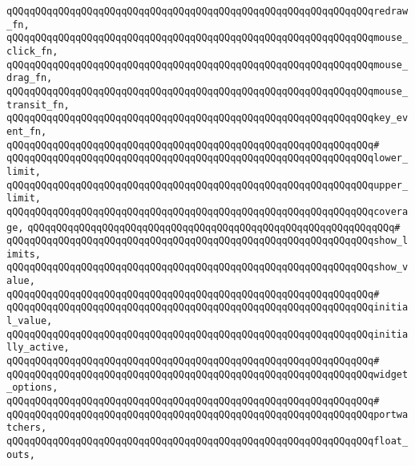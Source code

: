 \verb|qQQqqQQqqQQqqQQqqQQqqQQqqQQqqQQqqQQqqQQqqQQqqQQqqQQqqQQqqQQqqQQqredraw_fn,|\newline
\verb|qQQqqQQqqQQqqQQqqQQqqQQqqQQqqQQqqQQqqQQqqQQqqQQqqQQqqQQqqQQqqQQqmouse_click_fn,|\newline
\verb|qQQqqQQqqQQqqQQqqQQqqQQqqQQqqQQqqQQqqQQqqQQqqQQqqQQqqQQqqQQqqQQqmouse_drag_fn,|\newline
\verb|qQQqqQQqqQQqqQQqqQQqqQQqqQQqqQQqqQQqqQQqqQQqqQQqqQQqqQQqqQQqqQQqmouse_transit_fn,|\newline
\verb|qQQqqQQqqQQqqQQqqQQqqQQqqQQqqQQqqQQqqQQqqQQqqQQqqQQqqQQqqQQqqQQqkey_event_fn,|\newline
\verb|qQQqqQQqqQQqqQQqqQQqqQQqqQQqqQQqqQQqqQQqqQQqqQQqqQQqqQQqqQQqqQQq#|\newline
\verb|qQQqqQQqqQQqqQQqqQQqqQQqqQQqqQQqqQQqqQQqqQQqqQQqqQQqqQQqqQQqqQQqlower_limit,|\newline
\verb|qQQqqQQqqQQqqQQqqQQqqQQqqQQqqQQqqQQqqQQqqQQqqQQqqQQqqQQqqQQqqQQqupper_limit,|\newline
\verb|qQQqqQQqqQQqqQQqqQQqqQQqqQQqqQQqqQQqqQQqqQQqqQQqqQQqqQQqqQQqqQQqcoverage,|\newline
\verb|qQQqqQQqqQQqqQQqqQQqqQQqqQQqqQQqqQQqqQQqqQQqqQQqqQQqqQQqqQQqqQQq#|\newline
\verb|qQQqqQQqqQQqqQQqqQQqqQQqqQQqqQQqqQQqqQQqqQQqqQQqqQQqqQQqqQQqqQQqshow_limits,|\newline
\verb|qQQqqQQqqQQqqQQqqQQqqQQqqQQqqQQqqQQqqQQqqQQqqQQqqQQqqQQqqQQqqQQqshow_value,|\newline
\verb|qQQqqQQqqQQqqQQqqQQqqQQqqQQqqQQqqQQqqQQqqQQqqQQqqQQqqQQqqQQqqQQq#|\newline
\verb|qQQqqQQqqQQqqQQqqQQqqQQqqQQqqQQqqQQqqQQqqQQqqQQqqQQqqQQqqQQqqQQqinitial_value,|\newline
\verb|qQQqqQQqqQQqqQQqqQQqqQQqqQQqqQQqqQQqqQQqqQQqqQQqqQQqqQQqqQQqqQQqinitially_active,|\newline
\verb|qQQqqQQqqQQqqQQqqQQqqQQqqQQqqQQqqQQqqQQqqQQqqQQqqQQqqQQqqQQqqQQq#|\newline
\verb|qQQqqQQqqQQqqQQqqQQqqQQqqQQqqQQqqQQqqQQqqQQqqQQqqQQqqQQqqQQqqQQqwidget_options,|\newline
\verb|qQQqqQQqqQQqqQQqqQQqqQQqqQQqqQQqqQQqqQQqqQQqqQQqqQQqqQQqqQQqqQQq#|\newline
\verb|qQQqqQQqqQQqqQQqqQQqqQQqqQQqqQQqqQQqqQQqqQQqqQQqqQQqqQQqqQQqqQQqportwatchers,|\newline
\verb|qQQqqQQqqQQqqQQqqQQqqQQqqQQqqQQqqQQqqQQqqQQqqQQqqQQqqQQqqQQqqQQqfloat_outs,|\newline
